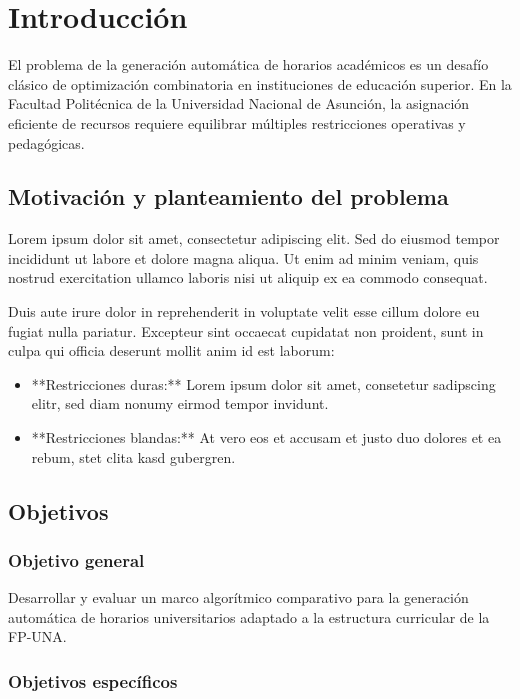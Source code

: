 \chapter{Introducción}
\label{chap:introduccion}

El problema de la generación automática de horarios académicos es un desafío clásico de optimización combinatoria en instituciones de educación superior. En la Facultad Politécnica de la Universidad Nacional de Asunción, la asignación eficiente de recursos requiere equilibrar múltiples restricciones operativas y pedagógicas.

\section{Motivación y planteamiento del problema}

Lorem ipsum dolor sit amet, consectetur adipiscing elit. Sed do eiusmod tempor incididunt ut labore et dolore magna aliqua. Ut enim ad minim veniam, quis nostrud exercitation ullamco laboris nisi ut aliquip ex ea commodo consequat.

Duis aute irure dolor in reprehenderit in voluptate velit esse cillum dolore eu fugiat nulla pariatur. Excepteur sint occaecat cupidatat non proident, sunt in culpa qui officia deserunt mollit anim id est laborum:

\begin{itemize}
    \item **Restricciones duras:** Lorem ipsum dolor sit amet, consetetur sadipscing elitr, sed diam nonumy eirmod tempor invidunt.
    \item **Restricciones blandas:** At vero eos et accusam et justo duo dolores et ea rebum, stet clita kasd gubergren.
\end{itemize}

\section{Objetivos}

\subsection{Objetivo general}

Desarrollar y evaluar un marco algorítmico comparativo para la generación automática de horarios universitarios adaptado a la estructura curricular de la FP-UNA.

\subsection{Objetivos específicos}

